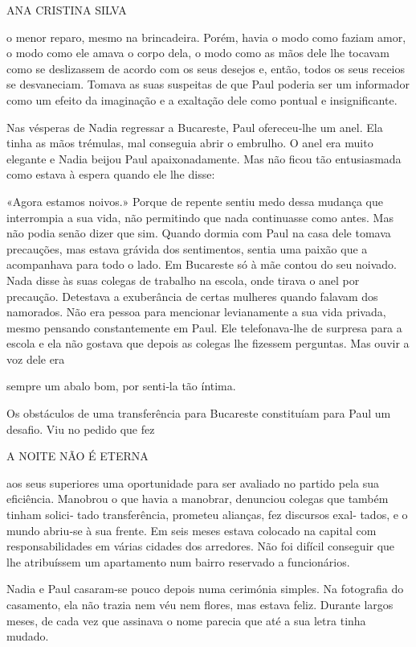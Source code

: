 ANA CRISTINA SILVA

o menor reparo, mesmo na brincadeira. Porém, havia o modo como faziam
amor, o modo como ele amava o corpo dela, o modo como as mãos dele lhe
tocavam como se deslizassem de acordo com os seus desejos e, então,
todos os seus receios se desvaneciam. Tomava as suas suspeitas de que
Paul poderia ser um informador como um efeito da imaginação e a
exaltação dele como pontual e insignificante.

Nas vésperas de Nadia regressar a Bucareste, Paul ofereceu‑lhe um anel.
Ela tinha as mãos trémulas, mal conseguia abrir o embrulho. O anel era
muito elegante e Nadia beijou Paul apaixonadamente. Mas não ficou tão
entusiasmada como estava à espera quando ele lhe disse:

«Agora estamos noivos.» Porque de repente sentiu medo dessa mudança que
interrompia a sua vida, não permitindo que nada continuasse como antes.
Mas não podia senão dizer que sim. Quando dormia com Paul na casa dele
tomava precauções, mas estava grávida dos sentimentos, sentia uma paixão
que a acompanhava para todo o lado. Em Bucareste só à mãe contou do seu
noivado. Nada disse às suas colegas de trabalho na escola, onde tirava o
anel por precaução. Detestava a exuberância de certas mulheres quando
falavam dos namorados. Não era pessoa para mencionar levianamente a sua
vida privada, mesmo pensando constantemente em Paul. Ele telefonava‑lhe
de surpresa para a escola e ela não gostava que depois as colegas lhe
fizessem perguntas. Mas ouvir a voz dele era

sempre um abalo bom, por senti‑la tão íntima.

Os obstáculos de uma transferência para Bucareste constituíam para Paul
um desafio. Viu no pedido que fez

A NOITE NÃO É ETERNA

aos seus superiores uma oportunidade para ser avaliado no partido pela
sua eficiência. Manobrou o que havia a manobrar, denunciou colegas que
também tinham solici‑ tado transferência, prometeu alianças, fez
discursos exal‑ tados, e o mundo abriu‑se à sua frente. Em seis meses
estava colocado na capital com responsabilidades em várias cidades dos
arredores. Não foi difícil conseguir que lhe atribuíssem um apartamento
num bairro reservado a funcionários.

Nadia e Paul casaram‑se pouco depois numa cerimónia simples. Na
fotografia do casamento, ela não trazia nem véu nem flores, mas estava
feliz. Durante largos meses, de cada vez que assinava o nome parecia que
até a sua letra tinha mudado.

